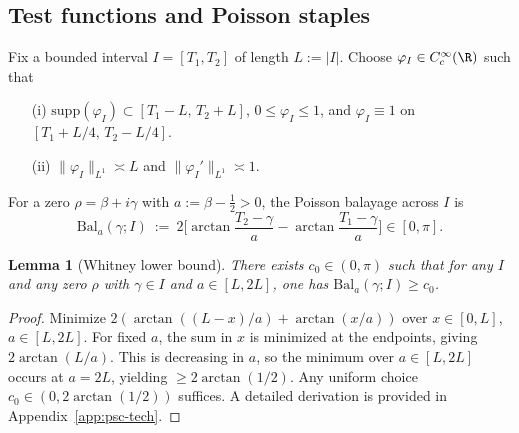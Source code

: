 \documentclass[11pt]{article}
\newtheorem{lemma}[theorem]{Lemma}
\theoremstyle{remark}
\begin{document}
\subsection{Test functions and Poisson staples}
Fix a bounded interval \(I=[T_1,T_2]\) of length \(L:=|I|\). Choose \(\varphi_I\in C_c^\infty(\R)\) such that
\begin{enumerate}
\item[(i)] \(\mathrm{supp}(\varphi_I)\subset [T_1-L,\,T_2+L]\), \(0\le\varphi_I\le 1\), and \(\varphi_I\equiv 1\) on \([T_1+L/4,\,T_2-L/4]\).
\item[(ii)] \(\|\varphi_I\|_{L^1}\asymp L\) and \(\|\varphi_I'\|_{L^1}\asymp 1\).
\end{enumerate}
For a zero \(\rho=\beta+i\gamma\) with \(a:=\beta-\tfrac12>0\), the Poisson balayage across \(I\) is
\[ \mathrm{Bal}_a(\gamma;I)\ :=\ 2\Big[\arctan\!\frac{T_2-\gamma}{a}-\arctan\!\frac{T_1-\gamma}{a}\Big] \in [0,\pi].\]

\begin{lemma}[Whitney lower bound]\label{lem:whitney-lower}
There exists \(c_0\in(0,\pi)\) such that for any \(I\) and any zero \(\rho\) with \(\gamma\in I\) and \(a\in[L,2L]\), one has \(\mathrm{Bal}_a(\gamma;I)\ge c_0\).
\end{lemma}
\begin{proof}
Minimize \(2(\arctan((L-x)/a)+\arctan(x/a))\) over \(x\in[0,L]\), \(a\in[L,2L]\). For fixed \(a\), the sum in \(x\) is minimized at the endpoints, giving \(2\arctan(L/a)\). This is decreasing in \(a\), so the minimum over \(a\in[L,2L]\) occurs at \(a=2L\), yielding \(\ge 2\arctan(1/2)\). Any uniform choice \(c_0\in(0,2\arctan(1/2))\) suffices. A detailed derivation is provided in Appendix~\ref{app:psc-tech}.
\end{proof}
\end{document}
